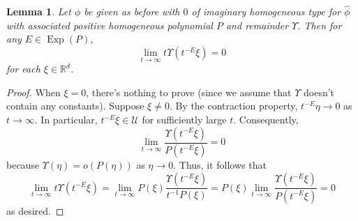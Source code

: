 \documentclass[11pt]{article}
\newtheorem{lemma}[theorem]{Lemma}
\newcommand\Exp{\operatorname{Exp}}
\newcommand\R{\mathbb{R}}
\newcommand{\f}[2]{\frac{#1}{#2}}
\begin{document}
\begin{lemma}\label{lem:UpsilonWithLimit}
Let $\phi$ be given as before with $0$ of imaginary homogeneous type for $\hat{\phi}$ with associated positive homogeneous polynomial $P$ and remainder $\Upsilon$. Then for any $E\in \Exp(P)$,
\begin{equation*}
    \lim_{t\to \infty} t \Upsilon(t^{-E}\xi) =0
\end{equation*}
for each $\xi \in \R^d$.
\end{lemma}
\begin{proof}
When $\xi = 0$, there's nothing to prove (since we assume that $\Upsilon$ doesn't contain any constants). Suppose $\xi\neq 0$. By the contraction property, $t^{-E}\eta \to 0$ as $t\to \infty$. In particular, $t^{-E}\xi\in \mathcal{U}$ for sufficiently large $t$. Consequently, 
\begin{equation*}
    \lim_{t\to \infty} \f{\Upsilon(t^{-E}\xi)}{P(t^{-E}\xi)} = 0
\end{equation*}
because $\Upsilon(\eta) = o(P(\eta))$ as $\eta \to 0$. Thus, it follows that
\begin{equation*}
    \lim_{t\to \infty} t\Upsilon(t^{-E}\xi) = \lim_{t\to \infty} P(\xi)\f{\Upsilon(t^{-E}\xi)}{t^{-1}P(\xi)} = P(\xi) \lim_{t\to \infty} \f{\Upsilon(t^{-E}\xi)}{P(t^{-E}\xi)} =0 
\end{equation*}
as desired.
\end{proof}
\end{document}
